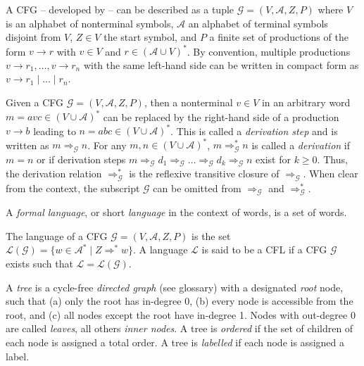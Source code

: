 \documentclass[
    a4paper,
    12pt,
    twoside,
    BCOR=12mm,
    parskip=half,
    chapterprefix,
    numbers=noenddot,
    bibliography=totoc
]{scrbook}
\begin{document}
A \gls{CFG} -- developed by \citet{chomsky_certain_1959} -- can be described \citep[sect. 6.1]{kastens_modellierung:_2008} as a tuple $\mathcal{G} = (V, \mathcal{A}, Z, P)$ where $V$ is an alphabet of nonterminal symbols, $\mathcal{A}$ an alphabet of terminal symbols disjoint from $V$, $Z \in V$ the start symbol, and $P$ a finite set of productions of the form $v \to r$ with $v \in V$ and $r \in (\mathcal{A} \cup V)^*$. By convention, multiple productions $v \to r_1, \ldots, v \to r_n$  with the same left-hand side can be written in compact form as $v \to r_1 \mid \ldots \mid r_n$.

Given a \gls{CFG} $\mathcal{G} = (V, \mathcal{A}, Z, P)$, then a nonterminal $v \in V$ in an arbitrary word $m = a v c \in (V \cup \mathcal{A})^*$ can be replaced by the right-hand side of a production $v \to b$ leading to $n = a b c \in (V \cup \mathcal{A})^*$. This is called a \emph{derivation step} and is written as $m \Rightarrow_\mathcal{G} n$. For any $m,n \in (V \cup \mathcal{A})^*$, $m \Rightarrow^*_\mathcal{G} n$ is called a \emph{derivation} if $m=n$ or if derivation steps $m \Rightarrow_\mathcal{G} d_1 \Rightarrow_\mathcal{G} \ldots \Rightarrow_\mathcal{G} d_k \Rightarrow_\mathcal{G} n$ exist for $k \geq 0$. Thus, the derivation relation $\Rightarrow^*_\mathcal{G}$ is the reflexive transitive closure of $\Rightarrow_\mathcal{G}$. When clear from the context, the subscript $\mathcal{G}$ can be omitted from $\Rightarrow_\mathcal{G}$ and $\Rightarrow^*_\mathcal{G}$.

\begin{definition}
  \label{def:formallanguage}
	A \emph{formal language}, or short \emph{language} in the context of words, is a set of words.
\end{definition}


The language of a \gls{CFG} $\mathcal{G} = (V, \mathcal{A}, Z, P)$ is the set $\mathcal{L}(\mathcal{G}) = \{ w \in \mathcal{A}^* \mid Z \Rightarrow^* w \}$. A language $\mathcal{L}$ is said to be a \gls{CFL} if a \gls{CFG} $\mathcal{G}$ exists such that $\mathcal{L} = \mathcal{L}(\mathcal{G})$.

\begin{definition}[Tree]
  \label{def:tree}
  A \emph{tree} is a cycle-free \emph{directed graph} (see glossary) with a designated \emph{root} node, such that (a) only the root has in-degree 0, (b) every node is accessible from the root, and (c) all nodes except the root have in-degree 1.
  Nodes with out-degree 0 are called \emph{leaves}, all others \emph{inner nodes}.
  A tree is \emph{ordered} if the set of children of each node is assigned a total order.
  A tree is \emph{labelled} if each node is assigned a label.
\end{definition}
\end{document}
